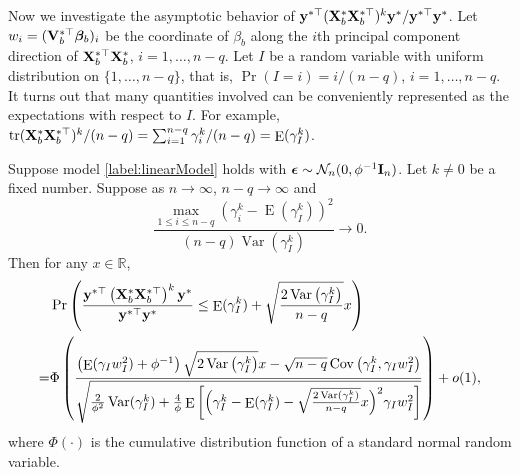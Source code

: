 \documentclass[smallextended]{svjour3}       %
\DeclareMathOperator{\mytr}{tr}
\DeclareMathOperator{\myE}{E}
\DeclareMathOperator{\myVar}{Var}
\DeclareMathOperator{\myCov}{Cov}
\newcommand{\By}{\mathbf{y}}    \newcommand{\Bz}{\mathbf{z}}
\newcommand{\bfsym}[1]{\ensuremath{\boldsymbol{#1}}}
\def\bbeta{\bfsym \beta}
\begin{document}
Now we investigate the asymptotic behavior of
    ${
\By^{*\top}
    (\BX_b^* \BX_b^{*\top})^{k} 
        \By^*
    }/{\By^{*\top} \By^*}$.
Let $w_i=(\BV_b^{*\top} \bbeta_b)_i$ be the coordinate of $\beta_b$ along the $i$th principal component direction of $\mathbf{X}_b^{*\top} \mathbf{X}_b^*$, $i=1,\ldots, n-q$.
Let $I$ be a random variable with uniform distribution on $\{1,\ldots, n-q\}$, that is, $\Pr \left( I=i \right)=i/(n-q)$, $i=1,\ldots, n-q$.
It turns out that many quantities involved can be conveniently represented as the expectations with respect to $I$.
For example, $
        {
            \mytr(\BX_b^* \BX_b^{*\top})^k
        }/
        (n-q )
        =
        \sum_{i=1}^{n-q} \gamma_i^k /(n-q)
        =\myE (\gamma_I^k)
$.

\begin{theorem}\label{generalTheorem}
    Suppose model \eqref{label:linearModel} holds with $\bepsilon\sim \mathcal N_n (0,\phi^{-1} \BI_n)$.
    Let $k\neq 0$ be a fixed number.
    Suppose as $n\to \infty$, $n-q\to \infty$ and
\begin{equation}
    \frac{
        \max_{1\leq i \leq n-q}
        \left( 
        \gamma_i^k
            -
                \myE (\gamma_I^k)
        \right)^2
    }{
        (n-q) \myVar (\gamma_I^k)
    }\to 0.
    \label{eq:toBeCondition}
\end{equation}
Then for any $x\in \mathbb R$,
\begin{equation*}
    \begin{split}
    &\Pr\left( 
        \frac{
            \By^{*\top} \left( \BX_b^* \BX_b^{*\top} \right)^k \By^*
        }{
            \By^{*\top} \By^*
        } 
        \leq 
        \myE (\gamma_I^k)
        +\sqrt{
            \frac{2\myVar\left( \gamma_I^k \right)}{n-q} 
        }
        x
    \right) 
    \\
    =&
    \Phi\left( 
        \frac{
            \left( \myE (\gamma_I w_I^2) + \phi^{-1} \right)
            \sqrt{{2\myVar\left( \gamma_I^k \right)}} 
            x
            -
            \sqrt{n-q}
            \myCov\left( \gamma_I^k, \gamma_I w_I^2 \right)
        }{
            \sqrt{
                \frac{2}{\phi^{2}} \myVar ( \gamma_I^k ) 
                +
                \frac{4}{\phi}
     \myE\left[ 
        \Big( \gamma_I^k -\myE(\gamma_I^k) -\sqrt{\frac{2\myVar (\gamma_I^k)}{n-q}}x \Big)^2
        \gamma_I w_I^2
    \right]
            }
        } 
    \right)
    +o(1)
    ,
    \end{split}
\end{equation*}
where $\Phi(\cdot)$ is the cumulative distribution function of a standard normal random variable.

\end{theorem}
\end{document}
